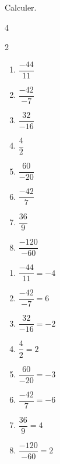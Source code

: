 \begin{exercice*}
    Calculer.
    \begin{multicols}4
      \begin{spacing}2
        \begin{enumerate}
          \item $\dfrac{-44}{11}$
          \item $\dfrac{-42}{-7}$
          \item $\dfrac{32}{-16}$
          \item $\dfrac{4}{2}$
          \item $\dfrac{60}{-20}$
          \item $\dfrac{-42}{7}$
          \item $\dfrac{36}{9}$
          \item $\dfrac{-120}{-60}$
        \end{enumerate}
      \end{spacing}
    \end{multicols}

\end{exercice*}
\begin{corrige}
        \begin{enumerate}
          \item $\dfrac{-44}{11}=-4$
          \item $\dfrac{-42}{-7}=6$
          \item $\dfrac{32}{-16}=-2$
          \item $\dfrac{4}{2}=2$
          \item $\dfrac{60}{-20}=-3$
          \item $\dfrac{-42}{7}=-6$
          \item $\dfrac{36}{9}=4$
          \item $\dfrac{-120}{-60}=2$
        \end{enumerate}
\end{corrige}


